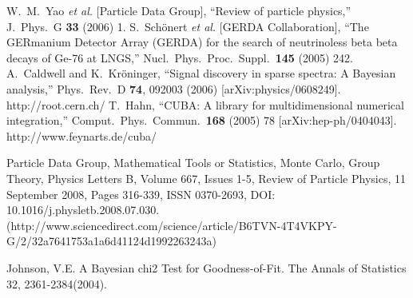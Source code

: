 \documentclass[11pt, a4paper]{article}
\begin{document}
\begin{thebibliography}{99}
%
  W.~M.~Yao {\it et al.}  [Particle Data Group],
  ``Review of particle physics,''
  J.\ Phys.\ G {\bf 33} (2006) 1.
%
  S.~Sch{\"o}nert {\it et al.}  [GERDA Collaboration],
  ``The GERmanium Detector Array (GERDA) for the search of neutrinoless beta
  beta decays of Ge-76 at LNGS,''
  Nucl.\ Phys.\ Proc.\ Suppl.\  {\bf 145} (2005) 242.
%
  A.~Caldwell and K.~Kr{\"o}ninger,
  ``Signal discovery in sparse spectra: A Bayesian analysis,''
  Phys.\ Rev.\  D {\bf 74}, 092003 (2006)
  [arXiv:physics/0608249].
%
http://root.cern.ch/
%
  T.~Hahn, ``CUBA: A library for multidimensional numerical
  integration,'' Comput.\ Phys.\ Commun.\ {\bf 168} (2005) 78
  [arXiv:hep-ph/0404043].
%
  http://www.feynarts.de/cuba/


Particle Data Group, Mathematical Tools or Statistics, Monte Carlo, Group Theory, Physics Letters B, Volume 667, Issues 1-5, Review of Particle Physics, 11 September 2008, Pages 316-339, ISSN 0370-2693, DOI: 10.1016/j.physletb.2008.07.030.
(http://www.sciencedirect.com/science/article/B6TVN-4T4VKPY-G/2/32a7641753a1a6d41124d1992263243a)

Johnson, V.E. A Bayesian chi2 Test for Goodness-of-Fit. The Annals of Statistics 32, 2361-2384(2004).

\end{thebibliography}
\end{document}
